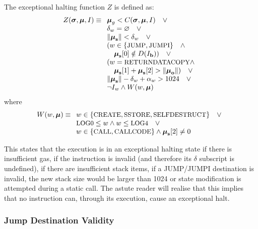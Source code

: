 \documentclass[9pt,oneside]{amsart}
\begin{document}
\begin{multicols}{2}
The exceptional halting function $Z$ is defined as:
\begin{equation}
Z(\boldsymbol{\sigma}, \boldsymbol{\mu}, I) \equiv
\begin{array}[t]{l}
\boldsymbol{\mu}_g < C(\boldsymbol{\sigma}, \boldsymbol{\mu}, I) \quad \vee \\
\mathbf{\delta}_w = \varnothing \quad \vee \\
\lVert\boldsymbol{\mu}_\mathbf{s}\rVert < \mathbf{\delta}_w \quad \vee \\
( w \in \{ \text{\small JUMP}, \text{\small JUMPI} \} \quad \wedge \\ \quad \boldsymbol{\mu}_\mathbf{s}[0] \notin D(I_\mathbf{b}) ) \quad \vee \\
( w = \text{\small RETURNDATACOPY} \wedge \\ \quad \boldsymbol{\mu}_\mathbf{s}[1] + \boldsymbol{\mu}_\mathbf{s}[2] > \lVert\boldsymbol{\mu}_\mathbf{o}\rVert) \quad \vee \\
 \lVert\boldsymbol{\mu}_\mathbf{s}\rVert - \mathbf{\delta}_w + \mathbf{\alpha}_w > 1024 \quad \vee \\
 \neg I_w \wedge W(w, \boldsymbol{\mu})
\end{array}
\end{equation}
where
\begin{equation}
W(w, \boldsymbol{\mu}) \equiv \begin{array}[t]{l}
w \in \{\text{\small CREATE}, \text{\small SSTORE}, \text{\small SELFDESTRUCT}\} \quad \vee \\
\text{\small LOG0} \le w \wedge w \le \text{\small LOG4} \quad \vee \\
w \in \{\text{\small CALL}, \text{\small CALLCODE}\} \wedge \boldsymbol{\mu}_\mathbf{s}[2] \neq 0
\end{array}
\end{equation}

This states that the execution is in an exceptional halting state if there is insufficient gas, if the instruction is invalid (and therefore its $\delta$ subscript is undefined), if there are insufficient stack items, if a {\small JUMP}/{\small JUMPI} destination is invalid, the new stack size would be larger than 1024 or state modification is attempted during a static call. The astute reader will realise that this implies that no instruction can, through its execution, cause an exceptional halt.

\subsubsection{Jump Destination Validity}


\end{multicols}
\end{document}

